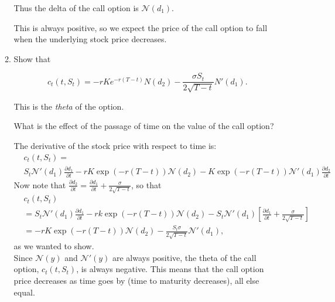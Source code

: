 \documentclass[handout,8pt]{beamer}
\begin{document}
\begin{frame}[allowframebreaks]{ }
\begin{enumerate}
\begin{enumerate}
        Thus the delta of the call option is $\mathcal{N}(d_1)$. \newline 
        
        This is always positive, so we expect the price of the call option to fall when the underlying stock price decreases.
        
        \newpage
                
        \vspace*{2cm}
        
         \item Show that


	\begin{equation}
            c_t(t,S_t) = -rKe^{-r(T-t)}N(d_2) - \frac{\sigma S_t}{2\sqrt{T-t}}N'(d_1).
        \end{equation}
        
        This is the \textit{theta} of the option. \newline
        
        What is the effect of the passage of time on the value of the call option? \newline
        
        \newpage
        
        The derivative of the stock price with respect to time is:
        \begin{align*}
            & c_t(t,S_t) = \\
            &S_t \mathcal{N}'(d_1) \frac{\partial d_1}{\partial t} - rK \exp(-r(T-t)) \mathcal{N}(d_2) - K \exp(-r(T-t))\mathcal{N}'(d_1) \frac{\partial d_2}{\partial t}
        \end{align*}
        Now note that $\frac{\partial d_2}{\partial t}=\frac{\partial d_1}{\partial t} + \frac{\sigma}{2\sqrt{T-t}}$, so that
        \begin{align*}
            &c_t(t,S_t) \\
            &= S_t\mathcal{N}'(d_1)\frac{\partial d_1}{\partial t} - rk \exp(-r(T-t)) \mathcal{N}(d_2) 
            - S_t\mathcal{N}'(d_1)\left[ \frac{\partial d_1}{\partial t} + \frac{\sigma}{2\sqrt{T-t}}\right]\\
            &= - rK \exp(-r(T-t))\mathcal{N}(d_2) - \frac{S_t\sigma}{2\sqrt{T-t}}\mathcal{N}'(d_1),
        \end{align*}
        as we wanted to show.\\
        
        Since $\mathcal{N}(y)$ and $\mathcal{N}'(y)$ are always positive, the theta of the call option, $c_t(t,S_t)$, is always negative. This means that the call option price 		
        decreases as time goes by (time to maturity decreases), all else equal.
        

\end{enumerate}
\end{enumerate}
\end{frame}
\end{document}
